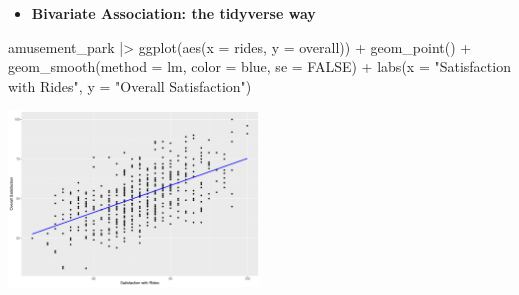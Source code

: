 \documentclass[
  ignorenonframetext,
]{beamer}
\newenvironment{Shaded}{\begin{snugshade}}{\end{snugshade}}
\newcommand{\AttributeTok}[1]{\textcolor[rgb]{0.40,0.45,0.13}{#1}}
\newcommand{\ConstantTok}[1]{\textcolor[rgb]{0.56,0.35,0.01}{#1}}
\newcommand{\FunctionTok}[1]{\textcolor[rgb]{0.28,0.35,0.67}{#1}}
\newcommand{\NormalTok}[1]{\textcolor[rgb]{0.00,0.23,0.31}{#1}}
\newcommand{\SpecialCharTok}[1]{\textcolor[rgb]{0.37,0.37,0.37}{#1}}
\newcommand{\StringTok}[1]{\textcolor[rgb]{0.13,0.47,0.30}{#1}}
\providecommand{\tightlist}{%
  \setlength{\itemsep}{0pt}\setlength{\parskip}{0pt}}\usepackage{longtable,booktabs,array}
\begin{document}
\begin{frame}[fragile]{}
\label{section-9}
\begin{itemize}
\tightlist
\item
  \textbf{Bivariate Association: the tidyverse way}
\end{itemize}

\tiny

\begin{Shaded}
\begin{Highlighting}[]
\NormalTok{amusement\_park }\SpecialCharTok{|\textgreater{}} \FunctionTok{ggplot}\NormalTok{(}\FunctionTok{aes}\NormalTok{(}\AttributeTok{x =}\NormalTok{ rides, }\AttributeTok{y =}\NormalTok{ overall)) }\SpecialCharTok{+}
  \FunctionTok{geom\_point}\NormalTok{() }\SpecialCharTok{+} 
  \FunctionTok{geom\_smooth}\NormalTok{(}\AttributeTok{method =} \StringTok{\textquotesingle{}lm\textquotesingle{}}\NormalTok{, }
              \AttributeTok{color =} \StringTok{\textquotesingle{}blue\textquotesingle{}}\NormalTok{, }
              \AttributeTok{se =} \ConstantTok{FALSE}\NormalTok{) }\SpecialCharTok{+} 
  \FunctionTok{labs}\NormalTok{(}\AttributeTok{x =} \StringTok{"Satisfaction with Rides"}\NormalTok{,}
       \AttributeTok{y =} \StringTok{"Overall Satisfaction"}\NormalTok{)}
\end{Highlighting}
\end{Shaded}

\begin{center}
\includegraphics[width=0.5\textwidth,height=\textheight]{007_identifying_drivers_of_outcomes_linear_models_files/figure-beamer/unnamed-chunk-8-1.pdf}
\end{center}
\end{frame}
\end{document}
